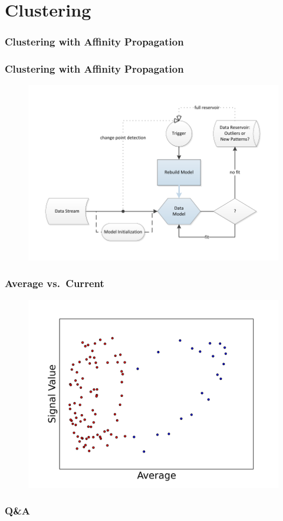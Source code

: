 \documentclass{beamer}
\begin{document}
  \section{Clustering}
  \begin{frame}
    \frametitle{Clustering with \textbf{Affinity Propagation}} 
  \end{frame}

  \begin{frame}[plain]
    \frametitle{Clustering with \textbf{Affinity Propagation}} 
    \begin{figure}[htbp]
      \includegraphics[width=\textwidth]{./gfx/APC.pdf}
    \end{figure}
  \end{frame}

  \begin{frame}[plain]
    \frametitle{Average vs.\ Current} 
    \begin{figure}
      \includegraphics[scale=.5]{./gfx/f1f5.png}
    \end{figure}
  \end{frame}

  \begin{frame}[plain]
    \frametitle{Q\&A}
  \end{frame}

\end{document}
